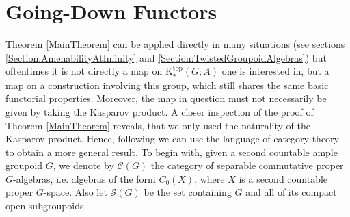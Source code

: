 \documentclass[reqno,oneside,a4paper,11pt]{amsart}
\theoremstyle{theorem}
\theoremstyle{definition}
\newcommand{\K}{\mathrm K}
\begin{document}
	\section{Going-Down Functors}
	Theorem \ref{MainTheorem} can be applied directly in many situations (see sections \ref{Section:AmenabilityAtInfinity} and \ref{Section:TwistedGroupoidAlgebras}) but oftentimes it is not directly a map on $\K_*^{\mathrm{top}}(G;A)$ one is interested in, but a map on a construction involving this group, which still shares the same basic functorial properties.
	Moreover, the map in question must not necessarily be given by taking the Kasparov product. A closer inspection of the proof of Theorem \ref{MainTheorem} reveals, that we only used the naturality of the Kasparov product. Hence, following \cite{CEO} we can use the language of category theory to obtain a more general result.
	To begin with, given a second countable ample groupoid $G$, we denote by $\mathcal{C}(G)$ the category of separable commutative proper $G$-algebras, i.e. algebras of the form $C_0(X)$, where $X$ is a second countable proper $G$-space. Also let $\mathcal{S}(G)$ be the set containing $G$ and all of its compact open subgroupoids.
\end{document}

